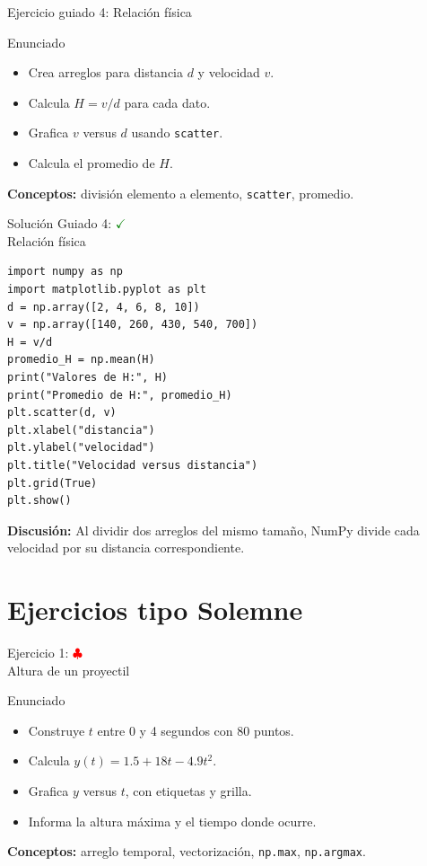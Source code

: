 \documentclass[10pt]{beamer}
\begin{document}
\begin{frame}{Ejercicio guiado 4: Relación física}
\begin{block}{Enunciado}
\begin{itemize}
  \item Crea arreglos para distancia \(d\) y velocidad \(v\).
  \item Calcula \(H=v/d\) para cada dato.
  \item Grafica \(v\) versus \(d\) usando \texttt{scatter}.
  \item Calcula el promedio de \(H\).
\end{itemize}
\end{block}
\textbf{Conceptos:} división elemento a elemento, \texttt{scatter}, promedio.
\end{frame}

\begin{solutionblock}
\begin{frame}[fragile]{Solución Guiado 4: \hfill \textcolor{green}{$\checkmark$} \\ Relación física}
\begin{verbatim}
import numpy as np
import matplotlib.pyplot as plt
d = np.array([2, 4, 6, 8, 10])
v = np.array([140, 260, 430, 540, 700])
H = v/d
promedio_H = np.mean(H)
print("Valores de H:", H)
print("Promedio de H:", promedio_H)
plt.scatter(d, v)
plt.xlabel("distancia")
plt.ylabel("velocidad")
plt.title("Velocidad versus distancia")
plt.grid(True)
plt.show()
\end{verbatim}
\textbf{Discusión:} Al dividir dos arreglos del mismo tamaño, NumPy divide cada velocidad por su distancia correspondiente.
\end{frame}
\end{solutionblock}

\section{Ejercicios tipo Solemne}
\begin{frame}{Ejercicio 1: \hfill \textcolor{red}{$\clubsuit$} \\ Altura de un proyectil}
\begin{block}{Enunciado}
\begin{itemize}
  \item Construye \(t\) entre 0 y 4 segundos con 80 puntos.
  \item Calcula \(y(t)=1.5+18t-4.9t^2\).
  \item Grafica \(y\) versus \(t\), con etiquetas y grilla.
  \item Informa la altura máxima y el tiempo donde ocurre.
\end{itemize}
\end{block}
\textbf{Conceptos:} arreglo temporal, vectorización, \texttt{np.max}, \texttt{np.argmax}.
\end{frame}
\end{document}

